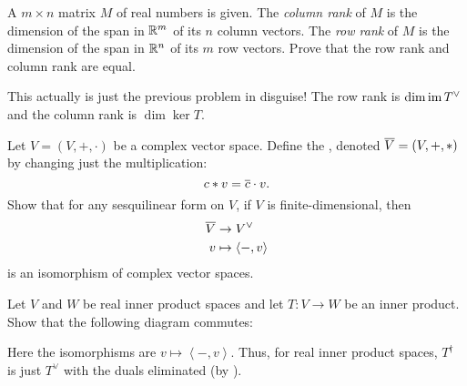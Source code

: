 \begin{dproblem}
	A $m \times n$ matrix $M$ of real numbers is given.
	The \emph{column rank} of $M$ is the dimension of the span in $\mathbb R^m$
	of its $n$ column vectors.
	The \emph{row rank} of $M$ is the dimension of the span in $\mathbb R^n$
	of its $m$ row vectors.
	Prove that the row rank and column rank are equal.
	\begin{hint}
		This actually is just the previous problem in disguise!
		The row rank is $\dim \operatorname{im} T^\vee$
		and the column rank is $\dim \ker T$.
	\end{hint}
\end{dproblem}

\begin{problem}
	\label{prob:complex_conj_space}
	Let $V = (V, +, \cdot)$ be a complex vector space.
	Define the ,
	denoted $\overline V = (V, +, \ast)$
	by changing just the multiplication:
	\[ c \ast v = \overline c \cdot v. \]
	Show that for any sesquilinear form on $V$,
	if $V$ is finite-dimensional, then
	\begin{align*}
		\overline V & \to V^\vee \\
		v &\mapsto \left< -, v \right>
	\end{align*}
	is an isomorphism of complex vector spaces.
\end{problem}

\begin{problem}
	Let $V$ and $W$ be real inner product spaces
	and let $T \colon V \to W$ be an inner product.
	Show that the following diagram commutes:
	\begin{center}
	\end{center}
	Here the isomorphisms are $v \mapsto \left< -, v\right>$.
	Thus, for real inner product spaces,
	$T^\dagger$ is just $T^\vee$ with the duals eliminated
	(by ).
\end{problem}

